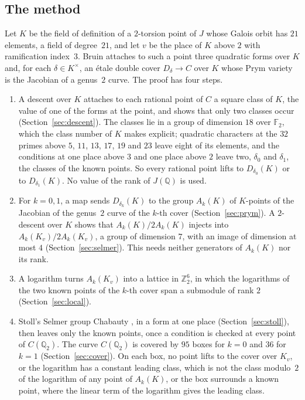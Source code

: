 \documentclass[11pt]{amsart}
\theoremstyle{definition}
\numberwithin{equation}{section}
\newcommand{\Q}{\mathbb{Q}}
\newcommand{\F}{\mathbb{F}}
\newcommand{\Qt}{\mathbb{Q}_2}
\newcommand{\Zt}{\mathbb{Z}_2}
\newcommand{\kv}{K_v}
\begin{document}
\subsection*{The method}
Let $K$ be the field of definition of a $2$-torsion point of $J$ whose Galois orbit has $21$ elements, a field of degree~$21$, and let $v$ be the place of $K$ above $2$ with ramification index~$3$. Bruin \cite{Bruin08} attaches to such a point three quadratic forms over $K$ and, for each $\delta\in K^\times$, an \'etale double cover $D_\delta\to C$ over $K$ whose Prym variety is the Jacobian of a genus~$2$ curve. The proof has four steps.
\begin{enumerate}
\item A descent over $K$ attaches to each rational point of $C$ a square class of $K$, the value of one of the forms at the point, and shows that only two classes occur (Section~\ref{sec:descent}). The classes lie in a group of dimension $18$ over $\F_2$, which the class number of $K$ makes explicit; quadratic characters at the $32$ primes above $5$, $11$, $13$, $17$, $19$ and $23$ leave eight of its elements, and the conditions at one place above $3$ and one place above $2$ leave two, $\delta_0$ and $\delta_1$, the classes of the known points. So every rational point lifts to $D_{\delta_0}(K)$ or to $D_{\delta_1}(K)$. No value of the rank of $J(\Q)$ is used.
\item For $k=0,1$, a map sends $D_{\delta_k}(K)$ to the group $A_k(K)$ of $K$-points of the Jacobian of the genus~$2$ curve of the $k$-th cover (Section~\ref{sec:prym}). A $2$-descent over $K$ shows that $A_k(K)/2A_k(K)$ injects into $A_k(\kv)/2A_k(\kv)$, a group of dimension $7$, with an image of dimension at most $4$ (Section~\ref{sec:selmer}). This needs neither generators of $A_k(K)$ nor its rank.
\item A logarithm turns $A_k(\kv)$ into a lattice in $\Zt^6$, in which the logarithms of the two known points of the $k$-th cover span a submodule of rank $2$ (Section~\ref{sec:local}).
\item Stoll's Selmer group Chabauty \cite[Theorem~2.1]{Stoll17}, in a form at one place (Section~\ref{sec:stoll}), then leaves only the known points, once a condition is checked at every point of $C(\Qt)$. The curve $C(\Qt)$ is covered by $95$ boxes for $k=0$ and $36$ for $k=1$ (Section~\ref{sec:cover}). On each box, no point lifts to the cover over $\kv$, or the logarithm has a constant leading class, which is not the class modulo~$2$ of the logarithm of any point of $A_k(K)$, or the box surrounds a known point, where the linear term of the logarithm gives the leading class.
\end{enumerate}
\end{document}
